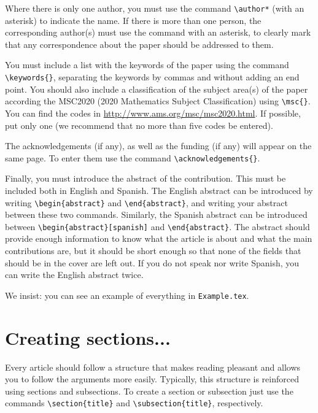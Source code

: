 \documentclass[babel-main=english]{TEMat-article}
\begin{document}
Where there is only one author, you must use the command \verb+\author*+ (with an asterisk) to indicate the name. If there is more than one person, the corresponding author(s) must use the command with an asterisk, to clearly mark that any correspondence about the paper should be addressed to them.

You must include a list with the keywords of the paper using the command \verb+\keywords{}+, separating the keywords by commas and without adding an end point.
You should also include a classification of the subject area(s) of the paper according the MSC2020 (2020 Mathematics Subject Classification) using \verb+\msc{}+.
You can find the codes in \url{http://www.ams.org/msc/msc2020.html}.
If possible, put only one (we recommend that no more than five codes be entered).

The acknowledgements (if any), as well as the funding (if any) will appear on the same page. To enter them use the command \verb+\acknowledgements{}+.

Finally, you must introduce the abstract of the contribution.
This must be included both in English and Spanish.
The English abstract can be introduced by writing \verb+\begin{abstract}+ and \verb+\end{abstract}+, and writing your abstract between these two commands.
Similarly, the Spanish abstract can be introduced between \verb+\begin{abstract}[spanish]+ and \verb+\end{abstract}+.
The abstract should provide enough information to know what the article is about and what the main contributions are, but it should be short enough so that none of the fields that should be in the cover are left out.
If you do not speak nor write Spanish, you can write the English abstract twice.

We insist: you can see an example of everything in \verb+Example.tex+.



\section{Creating sections...}

Every article should follow a structure that makes reading pleasant and allows you to follow the arguments more easily. Typically, this structure is reinforced using sections and subsections. To create a section or subsection just use the commands \verb+\section{title}+ and \verb+\subsection{title}+, respectively.
\end{document}
